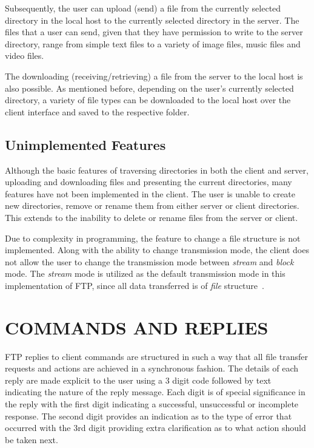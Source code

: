 \documentclass[10pt, conference]{IEEEtran}
\begin{document}
Subsequently, the user can upload (send) a file from the currently selected directory in the local host to the currently selected directory in the server. The files that a user can send, given that they have permission to write to the server directory, range from simple text files to a variety of image files, music files and video files.

The downloading (receiving/retrieving) a file from the server to the local host is also possible. As mentioned before, depending on the user's currently selected directory, a variety of file types can be downloaded to the local host over the client interface and saved to the respective folder.

\subsection{Unimplemented Features}
\label{sec: Client Unimplemented Features}
Although the basic features of traversing directories in both the client and server, uploading and downloading files and presenting the current directories, many features have not been implemented in the client. The user is unable to create new directories, remove or rename them from either server or client directories. This extends to the inability to delete or rename files from the server or client.

Due to complexity in programming, the feature to change a file structure is not implemented. Along with the ability to change transmission mode, the client does not allow the user to change the transmission mode between \textit{stream} and \textit{block} mode. The \textit{stream} mode is utilized as the default transmission mode in this implementation of FTP, since all data transferred is of \textit{file} structure~\cite{RFC959}.


%
\section{COMMANDS AND REPLIES}
\label{sec: Commands and Replies}
FTP replies to client commands are structured in such a way that all file transfer requests and actions are achieved in a synchronous fashion. The details of each reply are made explicit to the user using a 3 digit code followed by text indicating the nature of the reply message. Each digit is of special significance in the reply with the first digit indicating a successful, unsuccessful or incomplete response. The second digit provides an indication as to the type of error that occurred with the 3rd digit providing extra clarification as to what action should be taken next.
\end{document}
